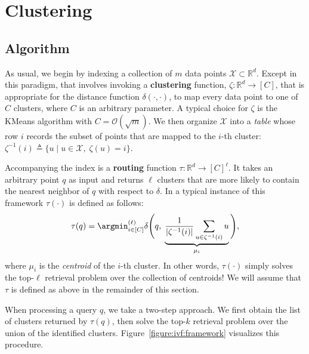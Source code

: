 \chapter{Clustering}
\label{chapter:ivf}


\section{Algorithm}
\label{section:ivf:retrieval}

As usual, we begin by indexing a collection of $m$ data points $\mathcal{X} \subset \mathbb{R}^d$.
Except in this paradigm, that involves invoking a \textbf{clustering} function,
$\zeta: \mathbb{R}^d \rightarrow [C]$,
that is appropriate for the distance function $\delta(\cdot, \cdot)$,
to map every data point to one of $C$ clusters, where $C$ is an arbitrary parameter.
A typical choice for $\zeta$ is the KMeans algorithm
with $C = \mathcal{O}(\sqrt{m})$.
We then organize $\mathcal{X}$ into a \emph{table} whose row $i$ records the subset
of points that are mapped to the $i$-th cluster: $\zeta^{-1}(i) \triangleq \{ u \;|\; u \in \mathcal{X}, \; \zeta(u) = i \}$.

Accompanying the index is a \textbf{routing} function $\tau: \mathbb{R}^d \rightarrow [C]^\ell$.
It takes an arbitrary point $q$ as input and returns $\ell$ clusters that are more likely to contain
the nearest neighbor of $q$ with respect to $\delta$. In a typical instance of this framework
$\tau(\cdot)$ is defined as follows:
\begin{equation}
    \label{equation:ivf:centroid-based-routing}
    \tau(q) = \argmin^{(\ell)}_{i \in [C]} \delta \Bigg(q,\; \underbrace{\frac{1}{\lvert \zeta^{-1}(i) \rvert} \sum_{u \in \zeta^{-1}(i)} u}_{\mu_i} \Bigg),
\end{equation}
where $\mu_i$ is the \emph{centroid} of the $i$-th cluster.
In other words, $\tau(\cdot)$ simply solves the top-$\ell$ retrieval problem
over the collection of centroids!
We will assume that $\tau$ is defined as above in the remainder of this section.

When processing a query $q$, we take a two-step approach.
We first obtain the list of clusters returned by $\tau(q)$, then solve the top-$k$
retrieval problem over the union of the identified clusters.
Figure~\ref{figure:ivf:framework} visualizes this procedure.

